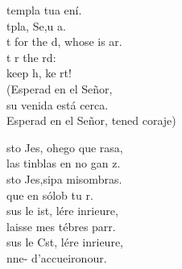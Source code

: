 \documentclass[12pt]{article}
\begin{document}
\begin{multicols*}{2}
\begin{cancion}%
	templa tua ení. \\
	tpla, Se,u a. \\
\jump
	t for the d, whose is ar. \\
	t r the rd: \\
	keep h, ke rt!\\
(Esperad en el Señor, \\
 su venida está cerca. \\
 Esperad en el Señor, tened coraje)\\
\end{cancion}%

\begin{cancion}%
	sto Jes, ohego que rasa,\\
	 las tinblas en  no gan z. \\
	sto Jes,sipa misombras. \\
	que en sólob tu r. \\
\jump
	sus le ist, lére inrieure, \\
	laisse  mes tébres parr.  \\
	sus le Cst, lére inrieure, \\
	nne- d’accueironour.\\
\end{cancion}%


\end{multicols*}
\end{document}
